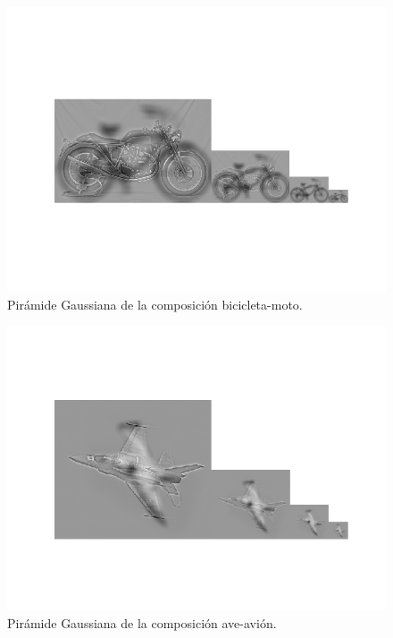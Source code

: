 \documentclass[11pt,a4paper]{article}
\begin{document}
\begin{figure}[H]
\centering
\includegraphics[scale=0.7]{img/hyb-pyr3.png}
\caption{Pirámide Gaussiana de la composición bicicleta-moto.}
\label{fig:hyb-pyr3}
\end{figure}

\begin{figure}[H]
\centering
\includegraphics[scale=0.7]{img/hyb-pyr4.png}
\caption{Pirámide Gaussiana de la composición ave-avión.}
\label{fig:hyb-pyr4}
\end{figure}
\end{document}

